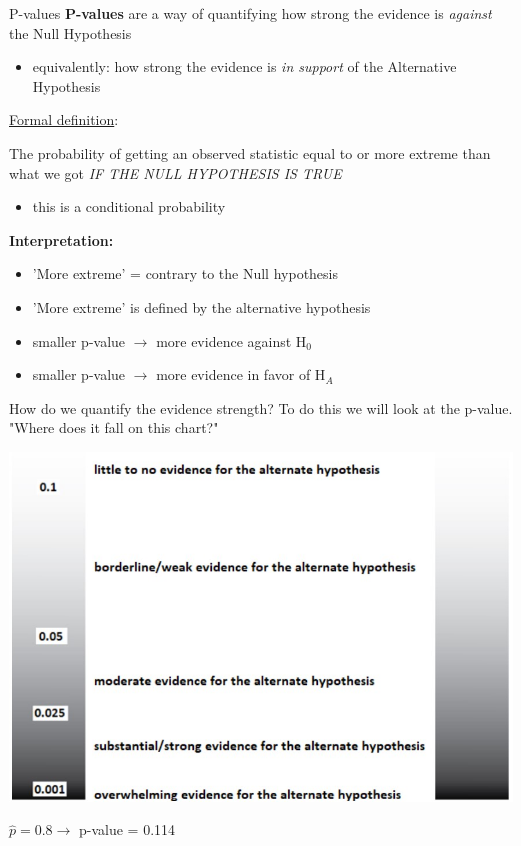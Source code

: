 \documentclass{beamer}
\begin{document}
\begin{frame}{P-values}
\textbf{P-values} are a way of quantifying how strong the evidence is \textit{against} the Null Hypothesis
\begin{itemize}
    \item equivalently: how strong the evidence is \textit{in support} of the Alternative Hypothesis
\end{itemize} \vspace{6mm}

\underline{Formal definition}:

The probability of getting an observed statistic equal to or more extreme than what we got \textit{IF THE NULL HYPOTHESIS IS TRUE}
\begin{itemize}
    \item this is a conditional probability
\end{itemize} \vspace{6mm}

\textbf{Interpretation:}
\begin{itemize}
    \item 'More extreme' = contrary to the Null hypothesis
    \item 'More extreme' is defined by the alternative hypothesis
    \item smaller p-value $\rightarrow$ more evidence against H$_0$
    \item smaller p-value $\rightarrow$ more evidence in favor of H$_A$
\end{itemize}
\end{frame}

\begin{frame}{How do we quantify the evidence strength?}
To do this we will look at the p-value. "Where does it fall on this chart?"
\begin{center}
    \includegraphics[scale=.6]{img/strength_chart.jpg}
\end{center}
$\widehat{p} = 0.8 \rightarrow$ p-value = 0.114
\end{frame}
\end{document}
